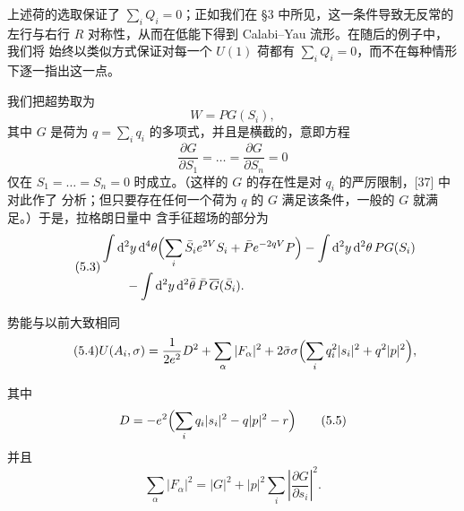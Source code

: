 上述荷的选取保证了 $\sum_i Q_i=0$；正如我们在 §3 中所见，这一条件导致无反常的
左行与右行 $R$ 对称性，从而在低能下得到 Calabi--Yau 流形。在随后的例子中，我们将
始终以类似方式保证对每一个 $U(1)$ 荷都有 $\sum_i Q_i=0$，而不在每种情形下逐一指出这一点。

我们把超势取为
\begin{equation}
W=PG(S_i),
\tag{5.1}
\end{equation}
其中 $G$ 是荷为 $q=\sum_i q_i$ 的多项式，并且是横截的，意即方程
\begin{equation}
\frac{\partial G}{\partial S_1}=\dots=\frac{\partial G}{\partial S_n}=0
\tag{5.2}
\end{equation}
仅在 $S_1=\dots=S_n=0$ 时成立。（这样的 $G$ 的存在性是对 $q_i$ 的严厉限制，[37] 中对此作了
分析；但只要存在任何一个荷为 $q$ 的 $G$ 满足该条件，一般的 $G$ 就满足。）于是，拉格朗日量中
含手征超场的部分为
\begin{equation}
\tag{5.3}
\begin{aligned}
&\int \mathrm{d}^2y\,\mathrm{d}^4\theta\Bigl(\sum_i\bar S_ie^{2V}S_i+\bar Pe^{-2qV}P\Bigr)
-\int \mathrm{d}^2y\,\mathrm{d}^2\theta\,PG(S_i)\\
&\qquad-\int \mathrm{d}^2y\,\mathrm{d}^2\bar\theta\,\bar P\,\overline{G}(\bar S_i).
\end{aligned}
\end{equation}

势能与以前大致相同
\begin{equation}
\tag{5.4}
U(A_i,\sigma)=\frac{1}{2e^2}D^2+\sum_\alpha|F_\alpha|^2
+2\bar\sigma\sigma\Bigl(\sum_iq_i^2|s_i|^2+q^2|p|^2\Bigr),
\end{equation}

\label{op:51}

其中
\begin{equation}
D=-e^2\Bigl(\sum_iq_i|s_i|^2-q|p|^2-r\Bigr)
\tag{5.5}
\end{equation}
并且
\begin{equation}
\sum_\alpha|F_\alpha|^2=|G|^2+|p|^2\sum_i\left|\frac{\partial G}{\partial s_i}\right|^2.
\tag{5.6}
\end{equation}

